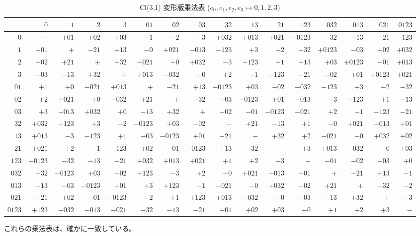 \documentclass[dvipdfmx,a4paper]{jsbook}
\theoremstyle{definition}
\theoremstyle{remark}
\begin{document}
\begin{table}[ht]
  \begin{center}
    \caption{Cl(3,1) 変形版乗法表 ($e_0, e_1, e_2, e_3 \mapsto 0,1,2,3$)}
    \tiny
    \begin{tabular}{r|rrrrrrrrrrrrrrr}
      &$0$&$1$&$2$&$3$&$01$&$02$&$03$&$32$&$13$&$21$&$123$&$032$&$013$&$021$&$0123$\\\hline
      $0$&$-$&$+01$&$+02$&$+03$&$-1$&$-2$&$-3$&$+032$&$+013$&$+021$&$+0123$&$-32$&$-13$&$-21$&$-123$\\
      $1$&$-01$&$+$&$-21$&$+13$&$-0$&$+021$&$-013$&$-123$&$+3$&$-2$&$-32$&$+0123$&$-03$&$+02$&$+032$\\
      $2$&$-02$&$+21$&$+$&$-32$&$-021$&$-0$&$+032$&$-3$&$-123$&$+1$&$-13$&$+03$&$+0123$&$-01$&$+013$\\
      $3$&$-03$&$-13$&$+32$&$+$&$+013$&$-032$&$-0$&$+2$&$-1$&$-123$&$-21$&$-02$&$+01$&$+0123$&$+021$\\
      $01$&$+1$&$+0$&$-021$&$+013$&$+$&$-21$&$+13$&$-0123$&$+03$&$-02$&$-032$&$-123$&$+3$&$-2$&$-32$\\
      $02$&$+2$&$+021$&$+0$&$-032$&$+21$&$+$&$-32$&$-03$&$-0123$&$+01$&$-013$&$-3$&$-123$&$+1$&$-13$\\
      $03$&$+3$&$-013$&$+032$&$+0$&$-13$&$+32$&$+$&$+02$&$-01$&$-0123$&$-021$&$+2$&$-1$&$-123$&$-21$\\
      $32$&$+032$&$-123$&$+3$&$-2$&$-0123$&$+03$&$-02$&$-$&$+21$&$-13$&$+1$&$-0$&$+021$&$-013$&$+01$\\
      $13$&$+013$&$-3$&$-123$&$+1$&$-03$&$-0123$&$+01$&$-21$&$-$&$+32$&$+2$&$-021$&$-0$&$+032$&$+02$\\
      $21$&$+021$&$+2$&$-1$&$-123$&$+02$&$-01$&$-0123$&$+13$&$-32$&$-$&$+3$&$+013$&$-032$&$-0$&$+03$\\
      $123$&$-0123$&$-32$&$-13$&$-21$&$+032$&$+013$&$+021$&$+1$&$+2$&$+3$&$-$&$-01$&$-02$&$-03$&$+0$\\
      $032$&$-32$&$-0123$&$+03$&$-02$&$+123$&$-3$&$+2$&$-0$&$+021$&$-013$&$+01$&$+$&$-21$&$+13$&$-1$\\
      $013$&$-13$&$-03$&$-0123$&$+01$&$+3$&$+123$&$-1$&$-021$&$-0$&$+032$&$+02$&$+21$&$+$&$-32$&$-2$\\
      $021$&$-21$&$+02$&$-01$&$-0123$&$-2$&$+1$&$+123$&$+013$&$-032$&$-0$&$+03$&$-13$&$+32$&$+$&$-3$\\
      $0123$&$+123$&$-032$&$-013$&$-021$&$-32$&$-13$&$-21$&$+01$&$+02$&$+03$&$-0$&$+1$&$+2$&$+3$&$-$\\
    \end{tabular}
  \end{center}
\end{table}
これらの乗法表は、確かに一致している。
\end{document}

